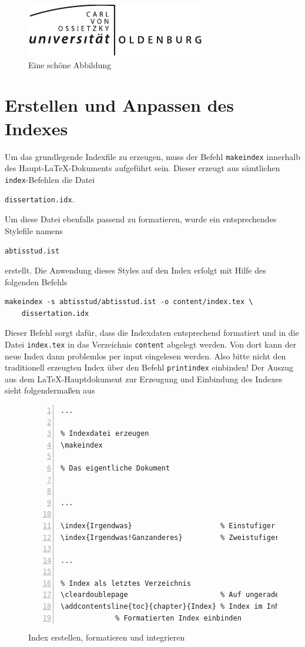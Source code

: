 \begin{figure}[ht]
  \centering
  \includegraphics[scale=1]{style/unilogo.pdf}
  \caption{Eine sch\"{o}ne Abbildung}\label{abbildung}
\end{figure}


\section{Erstellen und Anpassen des Indexes}
Um das grundlegende Indexfile zu erzeugen, muss der Befehl
\texttt{makeindex} innerhalb des Haupt-\LaTeX-Dokuments aufgef\"{u}hrt sein.
Dieser erzeugt aus s\"{a}mtlichen \texttt{index}-Befehlen die Datei

\texttt{dissertation.idx}.

Um diese Datei ebenfalls passend zu
formatieren, wurde ein entsprechendes Stylefile namens

\texttt{abtisstud.ist}

erstellt. Die Anwendung dieses Styles auf den
Index erfolgt mit Hilfe des folgenden Befehls

\begin{verbatim}
makeindex -s abtisstud/abtisstud.ist -o content/index.tex \
    dissertation.idx
\end{verbatim}

Dieser Befehl sorgt daf\"{u}r, dass die Indexdaten entsprechend
formatiert und in die Datei \texttt{index.tex} in das Verzeichnis
\texttt{content} abgelegt werden. Von dort kann der neue Index
dann problemlos per input eingelesen werden. Also bitte nicht den
traditionell erzeugten Index \"{u}ber den Befehl
\texttt{printindex} einbinden! Der Auszug aus dem
\LaTeX-Hauptdokument zur Erzeugung und Einbindung des Indexes sieht
folgenderma{\ss}en aus

\begin{figure}[ht]
\centering
\begin{Verbatim}[label=dissertation.tex,numberblanklines=false,fontsize=\scriptsize,numbers=left,frame=single]
...

% Indexdatei erzeugen
\makeindex

% Das eigentliche Dokument


...

\index{Irgendwas}                     % Einstufiger Indexeintrag
\index{Irgendwas!Ganzanderes}         % Zweistufiger Indexeintrag

...

% Index als letztes Verzeichnis
\cleardoublepage                      % Auf ungerader Seite beginnen
\addcontentsline{toc}{chapter}{Index} % Index im Inhaltsverzeichnis anzeigen
             % Formatierten Index einbinden

\end{Verbatim}
\caption{Index erstellen, formatieren und integrieren}\label{indexintegration}
\end{figure}


